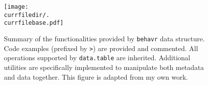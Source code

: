 \begin{figure}[h!]
	\centering   
	\texttt{[image: \\currfiledir/.\\currfilebase.pdf]}
	  \caption[Summary of operations in \texttt{behavr}]{
	Summary of the functionalities provided by \texttt{behavr} data structure.
	Code examples (prefixed by \texttt{>}) are provided and commented.
	All operations supported by \texttt{data.table} are inherited.
	Additional utilities are specifically implemented to manipulate both metadata and data together.  
	This figure is adapted from my own work\cite{geissmann_rethomics_2018}.
	\label{fig:\currfilebase}
}
\end{figure}
